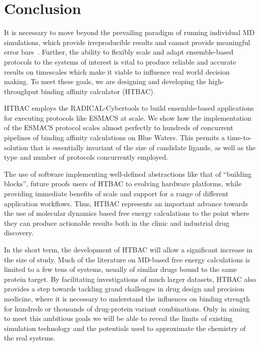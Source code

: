 \documentclass{bmcart}
\begin{document}
\section{Conclusion}\label{sec:4}

It is necessary to move beyond the prevailing paradigm of running individual
MD simulations, which provide irreproducible results and cannot provide
meaningful error bars~\cite{Bhati2017}. Further, the ability to flexibly
scale and adapt ensemble-based protocols to the systems of interest is vital
to produce reliable and accurate results on timescales which make it viable
to influence real world decision making. To meet these goals, we are
designing and developing the high-throughput binding affinity calculator
(HTBAC).

HTBAC employs the RADICAL-Cybertools to build ensemble-based applications for
executing protocols like ESMACS at scale. We show how the implementation of
the ESMACS protocol scales almost perfectly to hundreds of concurrent
pipelines of binding affinity calculations on Blue Waters. 
This permits a time-to-solution that is essentially invariant of the size
of candidate ligands, as well as the type and number of protocols concurrently employed.



The use of software implementing well-defined abstractions like that of
``building blocks'', future proofs users of HTBAC to evolving hardware
platforms, while providing immediate benefits of scale and support for a
range of different application workflows. Thus, HTBAC represents an important
advance towards the use of molecular dynamics based free energy calculations
to the point where they can produce actionable results both in the clinic and
industrial drug discovery.

In the short term, the development of HTBAC will allow a significant increase
in the size of study. Much of the literature on MD-based free energy
calculations is limited to a few tens of systems, usually of similar drugs
bound to the same protein target. By facilitating investigations of much
larger datasets, HTBAC also provides a step towards tackling grand challenges
in drug design and precision medicine, where it is necessary to understand
the influences on binding strength for hundreds or thousands of drug-protein
variant combinations. Only in aiming to meet this ambitious goals we will be
able to reveal the limits of existing simulation technology and the
potentials used to approximate the chemistry of the real systems.
\end{document}
